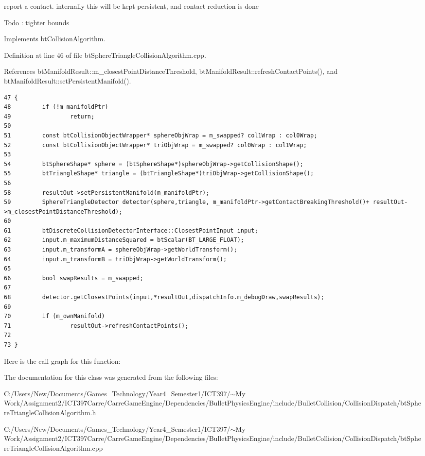 report a contact. internally this will be kept persistent, and contact reduction is done

\begin{Desc}
\item[\hyperlink{todo__todo000018}{Todo}]: tighter bounds \end{Desc}


Implements \hyperlink{classbt_collision_algorithm}{btCollisionAlgorithm}.

Definition at line 46 of file btSphereTriangleCollisionAlgorithm.cpp.

References btManifoldResult::m\_\-closestPointDistanceThreshold, btManifoldResult::refreshContactPoints(), and btManifoldResult::setPersistentManifold().

\begin{Code}\begin{verbatim}47 {
48         if (!m_manifoldPtr)
49                 return;
50 
51         const btCollisionObjectWrapper* sphereObjWrap = m_swapped? col1Wrap : col0Wrap;
52         const btCollisionObjectWrapper* triObjWrap = m_swapped? col0Wrap : col1Wrap;
53 
54         btSphereShape* sphere = (btSphereShape*)sphereObjWrap->getCollisionShape();
55         btTriangleShape* triangle = (btTriangleShape*)triObjWrap->getCollisionShape();
56         
58         resultOut->setPersistentManifold(m_manifoldPtr);
59         SphereTriangleDetector detector(sphere,triangle, m_manifoldPtr->getContactBreakingThreshold()+ resultOut->m_closestPointDistanceThreshold);
60         
61         btDiscreteCollisionDetectorInterface::ClosestPointInput input;
62         input.m_maximumDistanceSquared = btScalar(BT_LARGE_FLOAT);
63         input.m_transformA = sphereObjWrap->getWorldTransform();
64         input.m_transformB = triObjWrap->getWorldTransform();
65 
66         bool swapResults = m_swapped;
67 
68         detector.getClosestPoints(input,*resultOut,dispatchInfo.m_debugDraw,swapResults);
69 
70         if (m_ownManifold)
71                 resultOut->refreshContactPoints();
72         
73 }
\end{verbatim}
\end{Code}




Here is the call graph for this function:

The documentation for this class was generated from the following files:\begin{CompactItemize}
\item 
C:/Users/New/Documents/Games\_\-Technology/Year4\_\-Semester1/ICT397/$\sim$My Work/Assignment2/ICT397Carre/CarreGameEngine/Dependencies/BulletPhysicsEngine/include/BulletCollision/CollisionDispatch/btSphereTriangleCollisionAlgorithm.h\item 
C:/Users/New/Documents/Games\_\-Technology/Year4\_\-Semester1/ICT397/$\sim$My Work/Assignment2/ICT397Carre/CarreGameEngine/Dependencies/BulletPhysicsEngine/include/BulletCollision/CollisionDispatch/btSphereTriangleCollisionAlgorithm.cpp\end{CompactItemize}
